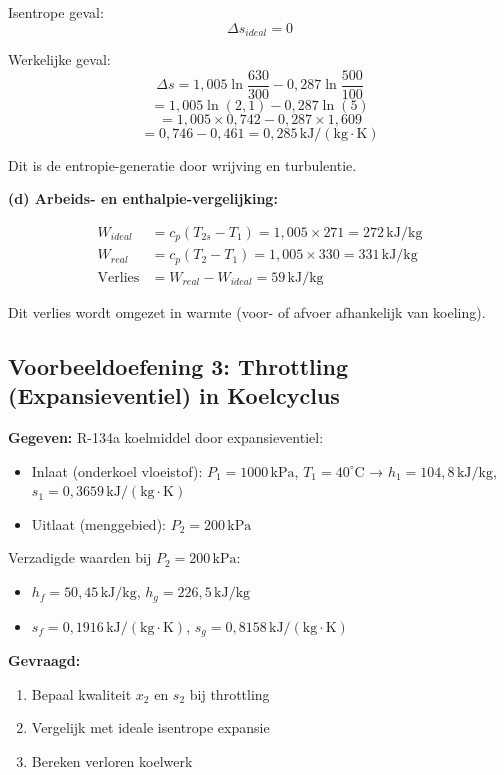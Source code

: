 \documentclass[a4paper,11pt,twoside]{report}
\begin{document}
Isentrope geval:
\[
\Delta s_{ideal} = 0
\]

Werkelijke geval:
\[
\Delta s = 1,005 \ln\frac{630}{300} - 0,287 \ln\frac{500}{100}
\]
\[
= 1,005 \ln(2,1) - 0,287 \ln(5)
\]
\[
= 1,005 \times 0,742 - 0,287 \times 1,609
\]
\[
= 0,746 - 0,461 = 0,285\,\mathrm{kJ/(kg \cdot K)}
\]

Dit is de entropie-generatie door wrijving en turbulentie.

\textbf{(d) Arbeids- en enthalpie-vergelijking:}

\begin{align}
W_{ideal} &= c_p(T_{2s} - T_1) = 1,005 \times 271 = 272\,\mathrm{kJ/kg}\\
W_{real} &= c_p(T_2 - T_1) = 1,005 \times 330 = 331\,\mathrm{kJ/kg}\\
\text{Verlies} &= W_{real} - W_{ideal} = 59\,\mathrm{kJ/kg}
\end{align}

Dit verlies wordt omgezet in warmte (voor- of afvoer afhankelijk van koeling).

\subsection*{Voorbeeldoefening 3: Throttling (Expansieventiel) in Koelcyclus}

\textbf{Gegeven:} R-134a koelmiddel door expansieventiel:
\begin{itemize}
    \item Inlaat (onderkoel vloeistof): $P_1 = 1000\,\mathrm{kPa}$, $T_1 = 40^\circ\mathrm{C}$ → $h_1 = 104,8\,\mathrm{kJ/kg}$, $s_1 = 0,3659\,\mathrm{kJ/(kg \cdot K)}$
    \item Uitlaat (menggebied): $P_2 = 200\,\mathrm{kPa}$
\end{itemize}

Verzadigde waarden bij $P_2 = 200\,\mathrm{kPa}$:
\begin{itemize}
    \item $h_f = 50,45\,\mathrm{kJ/kg}$, $h_g = 226,5\,\mathrm{kJ/kg}$
    \item $s_f = 0,1916\,\mathrm{kJ/(kg \cdot K)}$, $s_g = 0,8158\,\mathrm{kJ/(kg \cdot K)}$
\end{itemize}

\textbf{Gevraagd:}
\begin{enumerate}
    \item Bepaal kwaliteit $x_2$ en $s_2$ bij throttling
    \item Vergelijk met ideale isentrope expansie
    \item Bereken verloren koelwerk
\end{enumerate}
\end{document}
